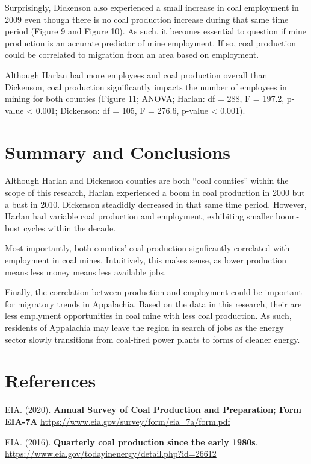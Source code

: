 \documentclass[12pt,]{article}
\begin{document}
Surprisingly, Dickenson also experienced a small increase in coal
employment in 2009 even though there is no coal production increase
during that same time period (Figure 9 and Figure 10). As such, it
becomes essential to question if mine production is an accurate
predictor of mine employment. If so, coal production could be correlated
to migration from an area based on employment.

Although Harlan had more employees and coal production overall than
Dickenson, coal production significantly impacts the number of employees
in mining for both counties (Figure 11; ANOVA; Harlan: df = 288, F =
197.2, p-value \textless{} 0.001; Dickenson: df = 105, F = 276.6,
p-value \textless{} 0.001).

\newpage

\hypertarget{summary-and-conclusions}{%
\section{Summary and Conclusions}\label{summary-and-conclusions}}

Although Harlan and Dickenson counties are both ``coal counties'' within
the scope of this research, Harlan experienced a boom in coal production
in 2000 but a bust in 2010. Dickenson steadidly decreased in that same
time period. However, Harlan had variable coal production and
employment, exhibiting smaller boom-bust cycles within the decade.

Most importantly, both counties' coal production signficantly correlated
with employment in coal mines. Intuitively, this makes sense, as lower
production means less money means less available jobs.

Finally, the correlation between production and employment could be
important for migratory trends in Appalachia. Based on the data in this
research, their are less emplyment opportunities in coal mine with less
coal production. As such, residents of Appalachia may leave the region
in search of jobs as the energy sector slowly transitions from
coal-fired power plants to forms of cleaner energy.

\newpage

\hypertarget{references}{%
\section{References}\label{references}}

EIA. (2020). \textbf{Annual Survey of Coal Production and Preparation;
Form EIA-7A} \url{https://www.eia.gov/survey/form/eia_7a/form.pdf}

EIA. (2016). \textbf{Quarterly coal production since the early 1980s}.
\url{https://www.eia.gov/todayinenergy/detail.php?id=26612}
\end{document}
